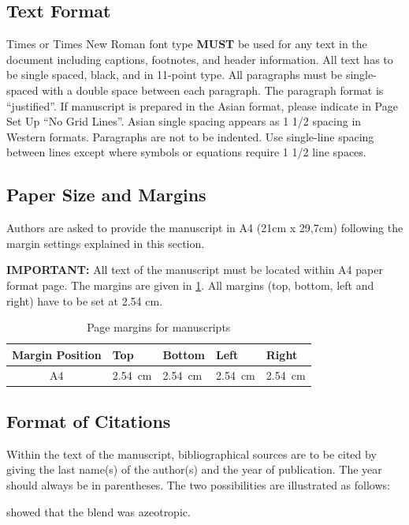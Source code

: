 \subsection{Text Format}
Times or Times New Roman font type \textbf{MUST} be used for any text in the document including captions, footnotes, and header information. All text has to be single spaced, black, and in 11-point type. All paragraphs must be single-spaced with a double space between each paragraph. The paragraph format is “justified”. If manuscript is prepared in the Asian format, please indicate in Page Set Up “No Grid Lines”. Asian single spacing appears as 1 1/2 spacing in Western formats.  Paragraphs are not to be indented. Use single-line spacing between lines except where symbols or equations require 1 1/2 line spaces.

\subsection{Paper Size and Margins}
Authors are asked to provide the manuscript in A4 (21cm x 29,7cm) following the margin settings explained in this section.

\textbf{IMPORTANT:} All text of the manuscript must be located within A4 paper format page. The margins are given in \cref{tab:margins}. All margins (top, bottom, left and right) have to be set at 2.54 cm.

\begin{table}[h!]
    \centering
    \caption{Page margins for manuscripts}
    \begin{tabular}{cllll}
        \toprule 
        Margin Position & Top & Bottom & Left & Right \\
        \midrule 
        A4 & \SI{2.54}{cm} & \SI{2.54}{cm} & \SI{2.54}{cm} & \SI{2.54}{cm} \\
        \bottomrule
    \end{tabular}
    \label{tab:margins}
\end{table}

\subsection{Format of Citations}
Within the text of the manuscript, bibliographical sources are to be cited by giving the last name(s) of the author(s) and the year of publication. The year should always be in parentheses. The two possibilities are illustrated as follows:
    
    \citet{Janna1986} showed that the blend was azeotropic.

